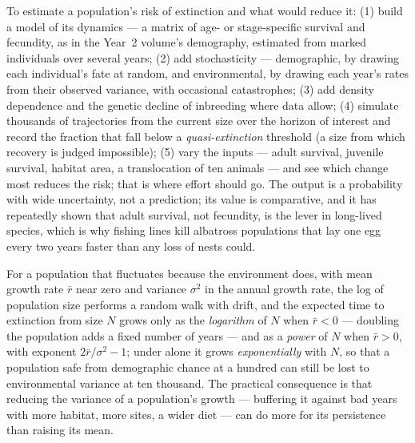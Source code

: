 \begin{method}\label{met:b3:conservation-biology:pva}
To estimate a population's risk of extinction and what would reduce it:
(1) build a model of its dynamics --- a matrix of age- or stage-specific
survival and fecundity, as in the Year~2 volume's demography, estimated
from marked individuals over several years; (2) add stochasticity ---
demographic, by drawing each individual's fate at random, and
environmental, by drawing each year's rates from their observed
variance, with occasional catastrophes; (3) add density dependence and
the genetic decline of inbreeding where data allow; (4) simulate
thousands of trajectories from the current size over the horizon of
interest and record the fraction that fall below a \emph{quasi-extinction}
threshold (a size from which recovery is judged impossible); (5) vary
the inputs --- adult survival, juvenile survival, habitat area, a
translocation of ten animals --- and see which change most reduces the
risk; that is where effort should go. The output is a probability with
wide uncertainty, not a prediction; its value is comparative, and it
has repeatedly shown that adult survival, not fecundity, is the lever
in long-lived species, which is why fishing lines kill albatross
populations that lay one egg every two years faster than any loss of
nests could.
\end{method}

\begin{proposition}\label{prop:b3:conservation-biology:time}
For a population that fluctuates because the environment does, with
mean growth rate $\bar r$ near zero and variance $\sigma^{2}$ in the
annual growth rate, the log of population size performs a random walk
with drift, and the expected time to extinction from size $N$ grows
only as the \emph{logarithm} of $N$ when $\bar r < 0$ --- doubling the
population adds a fixed number of years --- and as a \emph{power} of
$N$ when $\bar r > 0$, with exponent $2\bar r/\sigma^{2} - 1$; under
 alone it grows \emph{exponentially} with
$N$, so that a population safe from demographic chance at a hundred
can still be lost to environmental variance at ten thousand. The
practical consequence is that reducing the variance of a population's
growth --- buffering it against bad years with more habitat, more
sites, a wider diet --- can do more for its persistence than raising
its mean.
\end{proposition}
\admitted

